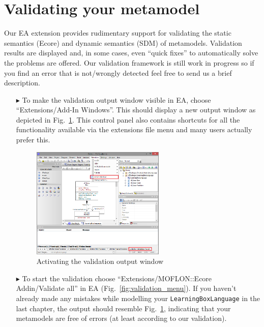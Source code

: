 \section{Validating your metamodel}
\label{sect:validating}


Our EA extension provides rudimentary support for validating the static semantics (Ecore) and dynamic semantics (SDM) of metamodels.
Validation results are displayed and, in some cases, even ``quick fixes'' to automatically solve the problems are offered.
Our validation framework is still work in progress so if you find an error that is not/wrongly detected feel free to send us a brief description.

\begin{enumerate}
\item[$\blacktriangleright$] To make the validation output window visible in EA, choose ``Extensions/\-Add-In Windows''.
This should display a new output window as depicted in Fig.~\ref{fig:validation_output}. This control panel also contains shortcuts for all the functionality available via the extensions file menu and many users actually prefer this.

\begin{figure}[htbp]
	\centering
  \includegraphics[width=0.6\textwidth]{pics/memBoxBilder/memBox40}
	\caption{Activating the validation output window}
	\label{fig:validation_output}
\end{figure}
\FloatBarrier

\item[$\blacktriangleright$] To start the validation choose ``Extensions/\-MOFLON::Ecore Addin/\-Validate all'' in EA (Fig.~\ref{fig:validation_menu}).
If you haven't already made any mistakes while modelling your \texttt{LearningBoxLanguage} in the last chapter, the output should resemble Fig.~\ref{fig:validation_output}, indicating that your metamodels are free of errors (at least according to our validation).


\end{enumerate}
